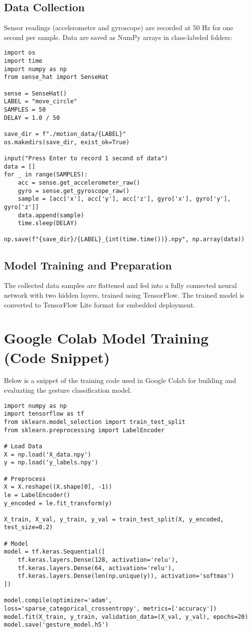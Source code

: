 \documentclass[a4paper,12pt]{article}
\begin{document}
\subsection*{Data Collection}
Sensor readings (accelerometer and gyroscope) are recorded at 50 Hz for one second per sample. Data are saved as NumPy arrays in class-labeled folders:

\begin{lstlisting}
import os
import time
import numpy as np
from sense_hat import SenseHat

sense = SenseHat()
LABEL = "move_circle"
SAMPLES = 50
DELAY = 1.0 / 50

save_dir = f"./motion_data/{LABEL}"
os.makedirs(save_dir, exist_ok=True)

input("Press Enter to record 1 second of data")
data = []
for _ in range(SAMPLES):
    acc = sense.get_accelerometer_raw()
    gyro = sense.get_gyroscope_raw()
    sample = [acc['x'], acc['y'], acc['z'], gyro['x'], gyro['y'], gyro['z']]
    data.append(sample)
    time.sleep(DELAY)

np.save(f"{save_dir}/{LABEL}_{int(time.time())}.npy", np.array(data))
\end{lstlisting}

\subsection*{Model Training and Preparation}
The collected data samples are flattened and fed into a fully connected neural network with two hidden layers, trained using TensorFlow. The trained model is converted to TensorFlow Lite format for embedded deployment.

\section{Google Colab Model Training (Code Snippet)}
Below is a snippet of the training code used in Google Colab for building and evaluating the gesture classification model.

\begin{lstlisting}
import numpy as np
import tensorflow as tf
from sklearn.model_selection import train_test_split
from sklearn.preprocessing import LabelEncoder

# Load Data
X = np.load('X_data.npy')
y = np.load('y_labels.npy')

# Preprocess
X = X.reshape((X.shape[0], -1))
le = LabelEncoder()
y_encoded = le.fit_transform(y)

X_train, X_val, y_train, y_val = train_test_split(X, y_encoded, test_size=0.2)

# Model
model = tf.keras.Sequential([
    tf.keras.layers.Dense(128, activation='relu'),
    tf.keras.layers.Dense(64, activation='relu'),
    tf.keras.layers.Dense(len(np.unique(y)), activation='softmax')
])

model.compile(optimizer='adam', loss='sparse_categorical_crossentropy', metrics=['accuracy'])
model.fit(X_train, y_train, validation_data=(X_val, y_val), epochs=20)
model.save('gesture_model.h5')
\end{lstlisting}
\end{document}
